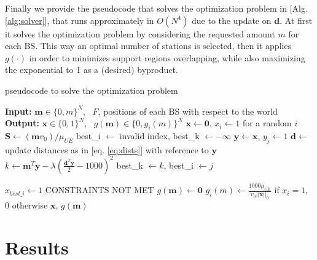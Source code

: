 \documentclass[conference,10pt]{IEEEtran}
\begin{document}
Finally we provide the pseudocode that solves the optimization problem in [Alg. \ref{alg:solver}], that runs approximately in $O(N^4)$ due to the update on $\mathbf{d}$. At first it solves the optimization problem by considering the requested amount $m$ for each BS. This way an optimal number of stations is selected, then it applies $g(\cdot)$ in order to minimizes support regions overlapping, while also maximizing the exponential to 1 as a (desired) byproduct.

\begin{algorithm}
	\caption{pseudocode to solve the optimization problem}
	\label{alg:solver}
	\begin{algorithmic}
		\STATE \textbf{Input:} $\mathbf{m} \in \{0, m\}^N, \textrm{ } F$, positions of each BS with respect to the world
		\STATE \textbf{Output:} $\mathbf{x} \in \{0, 1\}^N, \textrm{ } g(\mathbf{m}) \in \{0, g_i(m)\}^N$
		\STATE \null
			\STATE $\mathbf{x} \leftarrow \mathbf{0}$, $x_i \leftarrow 1$ for a random $i$
			\STATE $\mathbf{S} \leftarrow (\mathbf{m}v_0)/\mu_{U\!E}$
				\STATE best_i $\leftarrow$ invalid index, best_k $\leftarrow -\infty$ 
					\STATE $\mathbf{y} \leftarrow \mathbf{x}$, $y_j \leftarrow 1$
					\STATE $\mathbf{d} \leftarrow$ update distances as in [eq. \ref{eq:dists}] with reference to    	$\mathbf{y}$
					\STATE $k \leftarrow \mathbf{m}^T\mathbf{y} - \lambda\left(\frac{\mathbf{d}^T\mathbf{y}}{2} - 1000\right)^2$
						\STATE best_k $\leftarrow k$, best_i  $\leftarrow j$
					\ENDIF
				\ENDFOR 
				
					\STATE $x_{best\_i} \leftarrow 1$
				\ELSE
					\STATE CONSTRAINTS NOT MET
				\ENDIF
			\ENDWHILE
			\STATE $g(\mathbf{m}) \leftarrow \mathbf{0}$
				\STATE 	$g_i(m)\leftarrow \frac{1000\mu_{U\!E}}{v_0||\mathbf{x}||_0}$ if $x_i=1$, 0 otherwise
 			\ENDFOR
			\RETURN $\mathbf{x}$, $g(\mathbf{m})$
	\end{algorithmic}
\end{algorithm}



\section{Results}\label{sec:res}
\end{document}
